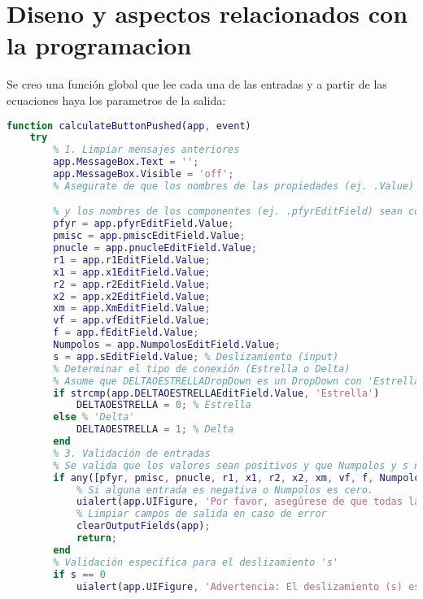 \section{Diseno y aspectos relacionados con la programacion}

Se creo una función global que lee cada una de las entradas y a partir de las ecuaciones haya los parametros de la salida: 


\begin{lstlisting}[language=Matlab, caption={MATLAB Code}, basicstyle=\footnotesize\ttfamily]
function calculateButtonPushed(app, event)
    try
        % 1. Limpiar mensajes anteriores
        app.MessageBox.Text = '';
        app.MessageBox.Visible = 'off';
        % Asegurate de que los nombres de las propiedades (ej. .Value)

        % y los nombres de los componentes (ej. .pfyrEditField) sean correctos.
        pfyr = app.pfyrEditField.Value;
        pmisc = app.pmiscEditField.Value;
        pnucle = app.pnucleEditField.Value;
        r1 = app.r1EditField.Value;
        x1 = app.x1EditField.Value;
        r2 = app.r2EditField.Value;
        x2 = app.x2EditField.Value;
        xm = app.XmEditField.Value;
        vf = app.vfEditField.Value;
        f = app.fEditField.Value;
        Numpolos = app.NumpolosEditField.Value;
        s = app.sEditField.Value; % Deslizamiento (input)
        % Determinar el tipo de conexión (Estrella o Delta)
        % Asume que DELTAOESTRELLADropDown es un DropDown con 'Estrella' y 'Delta'
        if strcmp(app.DELTAOESTRELLAEditField.Value, 'Estrella')
            DELTAOESTRELLA = 0; % Estrella
        else % 'Delta'
            DELTAOESTRELLA = 1; % Delta
        end
        % 3. Validación de entradas
        % Se valida que los valores sean positivos y que Numpolos y s no sean cero.
        if any([pfyr, pmisc, pnucle, r1, x1, r2, x2, xm, vf, f, Numpolos] < 0) || Numpolos == 0
            % Si alguna entrada es negativa o Numpolos es cero.
            uialert(app.UIFigure, 'Por favor, asegúrese de que todas las entradas sean valores numéricos válidos y positivos. El número de polos no puede ser cero.', 'Error de Entrada', 'Icon', 'error');
            % Limpiar campos de salida en caso de error
            clearOutputFields(app);
            return;
        end
        % Validación específica para el deslizamiento 's'
        if s == 0
            uialert(app.UIFigure, 'Advertencia: El deslizamiento (s) es cero. Esto implica que el motor está funcionando a velocidad síncrona. Algunas ecuaciones de potencia y par pueden resultar en cero.', 'Advertencia de Deslizamiento', 'Icon', 'warning');

\end{lstlisting}
